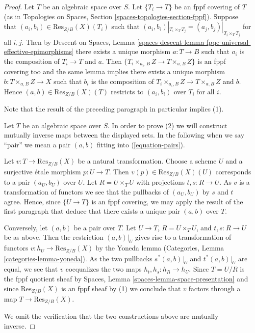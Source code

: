 \begin{proof}
Let $T$ be an algebraic space over $S$. Let $\{T_i \to T\}$ be an fppf
covering of $T$ (as in
Topologies on Spaces, Section \ref{spaces-topologies-section-fppf}).
Suppose that $(a_i, b_i) \in \text{Res}_{Z/B}(X)(T_i)$ such
that $(a_i, b_i)|_{T_i \times_T T_j} = (a_j, b_j)|_{T_i \times_T T_j}$
for all $i, j$. Then by
Descent on Spaces,
Lemma \ref{spaces-descent-lemma-fpqc-universal-effective-epimorphisms}
there exists a unique morphism $a : T \to B$ such that $a_i$ is the
composition of $T_i \to T$ and $a$. Then
$\{T_i \times_{a_i, B} Z \to T \times_{a, B} Z\}$ is an fppf covering
too and the same lemma implies there exists a unique morphism
$b : T \times_{a, B} Z \to X$ such that $b_i$ is the composition
of $T_i \times_{a_i, B} Z \to T \times_{a, B} Z$ and $b$. Hence
$(a, b) \in \text{Res}_{Z/B}(X)(T)$ restricts to $(a_i, b_i)$
over $T_i$ for all $i$.

\medskip\noindent
Note that the result of the preceding paragraph in particular implies (1).

\medskip\noindent
Let $T$ be an algebraic space over $S$. In order to prove (2) we will
construct mutually inverse maps between the displayed sets. In the
following when we say ``pair'' we mean a pair $(a, b)$ fitting
into (\ref{equation-pairs}).

\medskip\noindent
Let $v : T \to \text{Res}_{Z/B}(X)$ be a natural transformation.
Choose a scheme $U$ and a surjective \'etale morphism $p : U \to T$.
Then $v(p) \in \text{Res}_{Z/B}(X)(U)$ corresponds to a pair $(a_U, b_U)$
over $U$. Let $R = U \times_T U$ with projections $t, s : R \to U$.
As $v$ is a transformation of functors we see that the pullbacks of
$(a_U, b_U)$ by $s$ and $t$ agree. Hence, since $\{U \to T\}$ is an
fppf covering, we may apply the result of the first paragraph that
deduce that there exists a unique pair $(a, b)$ over $T$.

\medskip\noindent
Conversely, let $(a, b)$ be a pair over $T$.
Let $U \to T$, $R = U \times_T U$, and $t, s : R \to U$ be as
above. Then the restriction $(a, b)|_U$ gives rise to a
transformation of functors $v : h_U \to \text{Res}_{Z/B}(X)$ by the
Yoneda lemma
(Categories, Lemma \ref{categories-lemma-yoneda}).
As the two pullbacks $s^*(a, b)|_U$ and $t^*(a, b)|_U$
are equal, we see that $v$ coequalizes the two maps
$h_t, h_s : h_R \to h_U$. Since $T = U/R$ is the fppf quotient sheaf by
Spaces, Lemma \ref{spaces-lemma-space-presentation}
and since $\text{Res}_{Z/B}(X)$ is an fppf sheaf by (1) we conclude
that $v$ factors through a map $T \to \text{Res}_{Z/B}(X)$.

\medskip\noindent
We omit the verification that the two constructions above are mutually
inverse.
\end{proof}

